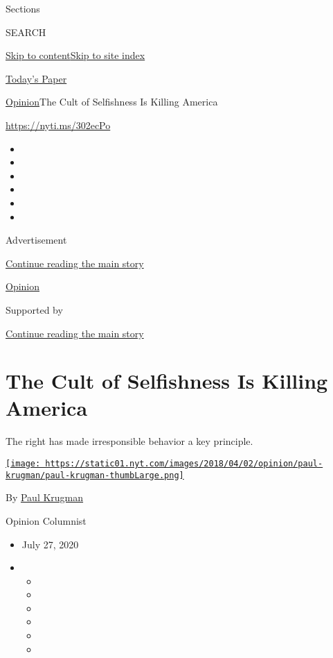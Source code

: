 Sections

SEARCH

\protect\hyperlink{site-content}{Skip to
content}\protect\hyperlink{site-index}{Skip to site index}

\href{https://myaccount.nytimes.com/auth/login?response_type=cookie\&client_id=vi}{}

\href{https://www.nytimes.com/section/todayspaper}{Today's Paper}

\href{/section/opinion}{Opinion}\textbar{}The Cult of Selfishness Is
Killing America

\href{https://nyti.ms/302ecPo}{https://nyti.ms/302ecPo}

\begin{itemize}
\item
\item
\item
\item
\item
\item
\end{itemize}

Advertisement

\protect\hyperlink{after-top}{Continue reading the main story}

\href{/section/opinion}{Opinion}

Supported by

\protect\hyperlink{after-sponsor}{Continue reading the main story}

\hypertarget{the-cult-of-selfishness-is-killing-america}{%
\section{The Cult of Selfishness Is Killing
America}\label{the-cult-of-selfishness-is-killing-america}}

The right has made irresponsible behavior a key principle.

\href{https://www.nytimes.com/by/paul-krugman}{\texttt{[image: https://static01.nyt.com/images/2018/04/02/opinion/paul-krugman/paul-krugman-thumbLarge.png]}}

By \href{https://www.nytimes.com/by/paul-krugman}{Paul Krugman}

Opinion Columnist

\begin{itemize}
\item
  July 27, 2020
\item
  \begin{itemize}
  \item
  \item
  \item
  \item
  \item
  \item
  \end{itemize}
\end{itemize}


